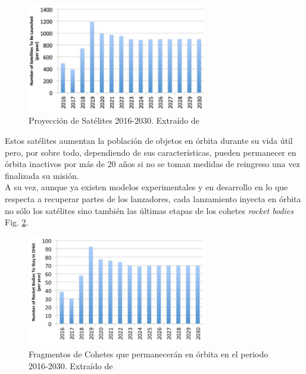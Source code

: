 \begin{figure}[!h]
  \centering
  \includegraphics[width=0.7\textwidth]{imagenes/satelxlanz}
  \caption[Proyecci\'on de Sat\'elites 2016-2030]{Proyecci\'on de Sat\'elites 2016-2030. Extra\'ido de \citep{karacalioglu2016impact}}
  \label{fig:satxlanz}
\end{figure}

Estos sat\'elites aumentan la poblaci\'on de objetos en \'orbita durante su vida \'util pero, por sobre todo, dependiendo de sus caracter\'isticas, pueden permanecer en \'orbita inactivos por m\'as de 20 a\~nos si no se toman medidas de reingreso una vez finalizada su misi\'on.\\
A su vez, aunque ya existen modelos experimentales y en desarrollo en lo que respecta a recuperar partes de los lanzadores, cada lanzamiento inyecta en \'orbita no s\'olo los sat\'elites sino tambi\'en las \'ultimas etapas de los cohetes {\it{rocket bodies}} Fig. \ref{fig:rocketbodies}.\\

\begin{figure}[!h]
  \centering
  \includegraphics[width=0.7\textwidth]{imagenes/rocketbodies}
  \caption[Fragmentos de Cohetes 2016-2030]{Fragmentos de Cohetes que permanecer\'an en \'orbita en el periodo 2016-2030. Extra\'ido de \cite{karacalioglu2016impact}}
  \label{fig:rocketbodies}
\end{figure}

